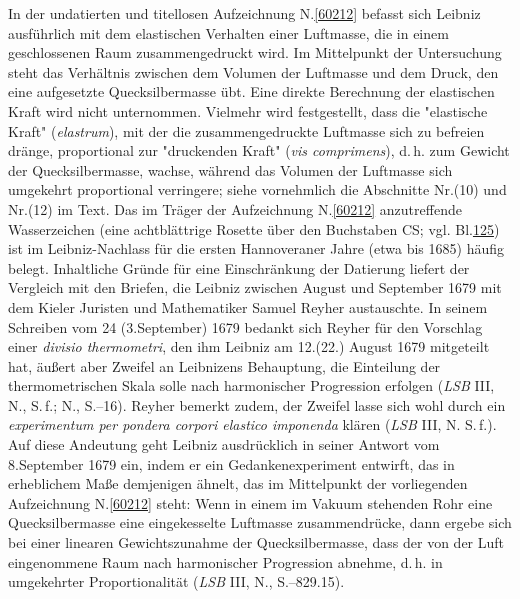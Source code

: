 \begin{ledgroup}%
\footnotesize%
\pstart%
\noindent%
%
In der undatierten und titellosen Aufzeichnung N.\;\ref{60212} befasst sich Leibniz ausführlich mit dem elastischen Verhalten einer Luftmasse, die in einem geschlossenen Raum zusammengedruckt wird.
Im Mittelpunkt der Untersuchung steht das Verhältnis zwischen dem Volumen der Luftmasse und dem Druck, den eine aufgesetzte Quecksilbermasse übt.
Eine direkte Berechnung der elastischen Kraft wird nicht unternommen.
Vielmehr wird festgestellt, dass die "elastische Kraft" (\textit{elastrum}), mit der die zusammengedruckte Luftmasse sich zu befreien dränge, proportional zur "druckenden Kraft" (\textit{vis comprimens}), d.\,h. zum Gewicht der Quecksilbermasse, wachse, während das Volumen der Luftmasse sich umgekehrt proportional verringere; siehe vornehmlich die Abschnitte Nr.\;(10) und Nr.\;(12) im Text.
\pend%
\pstart%
Das im Träger der Aufzeichnung N.\;\ref{60212} anzutreffende Wasserzeichen (eine achtblättrige Rosette über den Buchstaben CS; vgl. Bl.\:\href{\Scan{LH_37_03_125wz}}{125}) ist im Leibniz-Nachlass für die ersten Hannoveraner Jahre (etwa bis 1685) häufig belegt.
Inhaltliche Gründe für eine Einschränkung der Datierung liefert der Vergleich mit den Briefen, die Leibniz zwischen August und September 1679 mit dem Kieler Juristen und Mathematiker Samuel Reyher austauschte.
In seinem Schreiben vom 24\; (3.\;September) 1679 bedankt sich Reyher für den Vorschlag einer \textit{divisio thermometri}, den ihm Leibniz am 12.\;(22.) August 1679 mitgeteilt hat, äußert aber Zweifel an Leibnizens Behauptung, die Einteilung der thermometrischen Skala solle nach harmonischer Progression erfolgen (\textit{LSB} III, N., S.\,f.;\cite{01436}
N., S.--16).\cite{01434}
Reyher bemerkt zudem, der Zweifel lasse sich wohl durch ein \textit{experimentum per pondera corpori elastico imponenda} klären (\textit{LSB} III, N. S.\,f.).\cite{01434}
Auf diese Andeutung geht Leibniz ausdrücklich in seiner Antwort vom 8.\;September 1679 ein, indem er ein Gedankenexperiment entwirft, das in erheblichem Maße demjenigen ähnelt, das im Mittelpunkt der vorliegenden Aufzeichnung N.\;\ref{60212} steht:
Wenn in einem im Vakuum stehenden Rohr eine Quecksilbermasse eine eingekesselte Luftmasse zusammendrücke, dann ergebe sich bei einer linearen Gewichtszunahme der Quecksilbermasse, dass der von der Luft eingenommene Raum nach harmonischer Progression abnehme, d.\,h. in umgekehrter Proportionalität (\textit{LSB} III, N., S.--829.15).\cite{01435}

\end{ledgroup}
